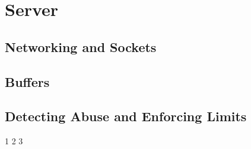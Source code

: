 \section{Server}

\subsection{Networking and Sockets}

\subsection{Buffers}

\subsection{Detecting Abuse and Enforcing Limits}
1
2
3
